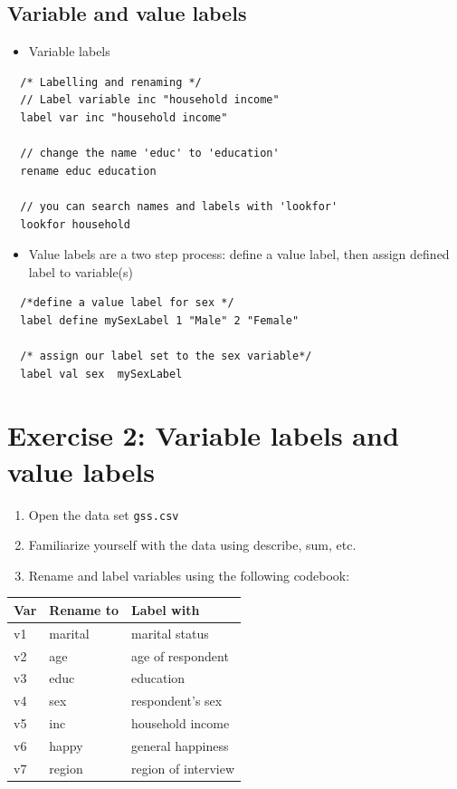 \documentclass[]{book}
\providecommand{\tightlist}{%
  \setlength{\itemsep}{0pt}\setlength{\parskip}{0pt}}
\begin{document}
\subsection{Variable and value labels}\label{variable-and-value-labels}

\begin{itemize}
\tightlist
\item
  Variable labels
\end{itemize}

\begin{verbatim}
  /* Labelling and renaming */
  // Label variable inc "household income"
  label var inc "household income"

  // change the name 'educ' to 'education'
  rename educ education

  // you can search names and labels with 'lookfor' 
  lookfor household
\end{verbatim}

\begin{itemize}
\tightlist
\item
  Value labels are a two step process: define a value label, then assign
  defined label to variable(s)
\end{itemize}

\begin{verbatim}
  /*define a value label for sex */
  label define mySexLabel 1 "Male" 2 "Female"

  /* assign our label set to the sex variable*/
  label val sex  mySexLabel
\end{verbatim}

\section{Exercise 2: Variable labels and value
labels}\label{exercise-2-variable-labels-and-value-labels}

\begin{enumerate}
\def\labelenumi{\arabic{enumi}.}
\tightlist
\item
  Open the data set \texttt{gss.csv}
\item
  Familiarize yourself with the data using describe, sum, etc.
\item
  Rename and label variables using the following codebook:
\end{enumerate}

\begin{longtable}[]{@{}lll@{}}
\toprule
Var & Rename to & Label with\tabularnewline
\midrule
\endhead
v1 & marital & marital status\tabularnewline
v2 & age & age of respondent\tabularnewline
v3 & educ & education\tabularnewline
v4 & sex & respondent's sex\tabularnewline
v5 & inc & household income\tabularnewline
v6 & happy & general happiness\tabularnewline
v7 & region & region of interview\tabularnewline
\bottomrule
\end{longtable}
\end{document}
